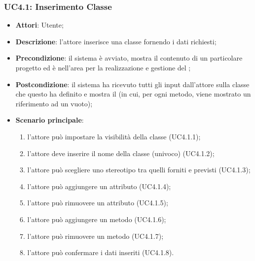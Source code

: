 \subsubsection{UC4.1: Inserimento Classe}
\label{UC4.1}
\begin{itemize}
	\item \textbf{Attori}: Utente;
	\item \textbf{Descrizione}: l'attore inserisce una classe fornendo i dati richiesti;
	\item \textbf{Precondizione}: il sistema è avviato, mostra il contenuto di un particolare progetto ed è nell'area per la realizzazione e gestione del ;
	\item \textbf{Postcondizione}: il sistema ha ricevuto tutti gli input dall'attore sulla classe che questo ha definito e mostra il  (in cui, per ogni metodo, viene mostrato un riferimento ad un  vuoto);
	\item \textbf{Scenario principale}:
	\begin{enumerate}
		\item l'attore può impostare la visibilità della classe (UC4.1.1);
		\item l'attore deve inserire il nome della classe (univoco) (UC4.1.2);
		\item l'attore può scegliere uno stereotipo tra quelli forniti e previsti (UC4.1.3);
		\item l'attore può aggiungere un attributo (UC4.1.4);
		\item l'attore può rimuovere un attributo (UC4.1.5);
		\item l'attore può aggiungere un metodo (UC4.1.6);
		\item l'attore può rimuovere un metodo (UC4.1.7);

		\item l'attore può confermare i dati inseriti (UC4.1.8).
	\end{enumerate}
\end{itemize}

